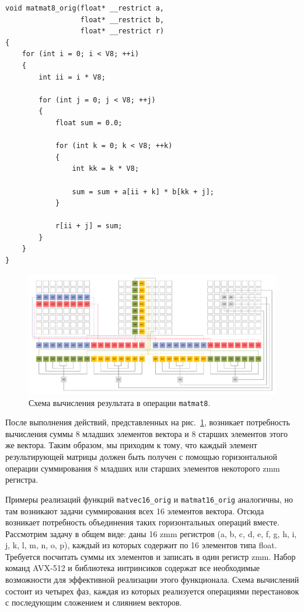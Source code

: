 \begin{singlespace}
\begin{lstlisting}[caption={Невекторизованная версия перемножения матриц \\ размера $8 \times 8$.}, label={lst:text_4_small_matr_8x8_mul_matr_noopt}]
void matmat8_orig(float* __restrict a,
                  float* __restrict b,
                  float* __restrict r)
{
    for (int i = 0; i < V8; ++i)
    {
        int ii = i * V8;
 
        for (int j = 0; j < V8; ++j)
        {
            float sum = 0.0;

            for (int k = 0; k < V8; ++k)
            {
                int kk = k * V8;
                
                sum = sum + a[ii + k] * b[kk + j];
            }

            r[ii + j] = sum;
        }
    }
}
\end{lstlisting}
\end{singlespace}

\begin{figure}[ht]
\centering
\includegraphics[width=1.00\textwidth]{./fig/vec_matmat8.pdf}
\singlespacing
{}\caption{Схема вычисления результата в операции \texttt{matmat8}.}
\label{fig:text_4_small_matr_matmat8}
\end{figure}

После выполнения действий, представленных на рис.~\ref{fig:text_4_small_matr_matmat8}, возникает потребность вычисления суммы 8 младших элементов вектора и 8 старших элементов этого же вектора.
Таким образом, мы приходим к тому, что каждый элемент результирующей матрицы должен быть получен с помощью горизонтальной операции суммирования 8 младших или старших элементов некоторого zmm регистра.

Примеры реализаций функций \texttt{matvec16\_orig} и \texttt{matmat16\_orig} аналогичны, но там возникают задачи суммирования всех 16 элементов вектора.
Отсюда возникает потребность объединения таких горизонтальных операций вместе.
Рассмотрим задачу в общем виде: даны 16 zmm регистров (a, b, c, d, e, f, g, h, i, j, k, l, m, n, o, p), каждый из которых содержит по 16 элементов типа float.
Требуется посчитать суммы их элементов и записать в один регистр zmm.
Набор команд AVX-512 и библиотека интринсиков содержат все необходимые возможности для эффективной реализации этого функционала.
Схема вычислений состоит из четырех фаз, каждая из которых реализуется операциями перестановок с последующим сложением и слиянием векторов.

